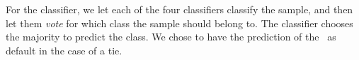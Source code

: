 For the \hy classifier, we let each of the four classifiers classify the sample, and then let them \emph{vote} for which class the sample should belong to. The \hy classifier chooses the majority to predict the class. We chose to have the prediction of the \mn\ \nb as default in the case of a tie.